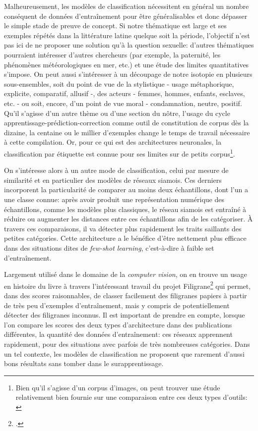 Malheureusement, les modèles de classification nécessitent en général un nombre conséquent de données d'entraînement pour être généralisables et donc dépasser le simple stade de preuve de concept. Si notre thématique est large et ses exemples répétés dans la littérature latine quelque soit la période, l'objectif n'est pas ici de ne proposer une solution qu'à la question sexuelle: d'autres thématiques pourraient intéresser d'autres chercheurs (par exemple, la paternité, les phénomènes météorologiques en mer, etc.) et une étude des limites quantitatives s'impose. On peut aussi s'intéresser à un découpage de notre isotopie en plusieurs sous-ensembles, soit du point de vue de la stylistique - usage métaphorique, explicite, comparatif, allusif -, des acteurs - femmes, hommes, enfants, esclaves, etc. - ou soit, encore, d'un point de vue moral - condamnation, neutre, positif. Qu'il s'agisse d'un autre thème ou d'une section du nôtre, l'usage du cycle apprentissage-prédiction-correction comme outil de constitution de corpus dès la dizaine, la centaine ou le millier d'exemples change le temps de travail nécessaire à cette compilation. Or, pour ce qui est des architectures neuronales, la classification par étiquette est connue pour ses limites sur de petits corpus\footnote{Bien qu'il s'agisse d'un corpus d'images, on peut trouver une étude relativement bien fournie sur une comparaison entre ces deux types d'outils: \cite{pasupa_comparison_2016}}. %

On s'intéresse alors à un autre mode de classification, celui par mesure de similarité et en particulier des modèles de réseaux siamois. Ces derniers incorporent la particularité de comparer au moins deux échantillons, dont l'un a une classe connue: après avoir produit une représentation numérique des échantillons, comme les modèles plus classiques, le réseau siamois est entraîné à réduire ou augmenter les distances entre ces échantillons afin de les catégoriser. À travers ces comparaisons, il va détecter plus rapidement les traits saillants des petites catégories. Cette architecture a le bénéfice d'être nettement plus efficace dans des situations dites de \textit{few-shot learning}, c'est-à-dire à faible set d'entraînement. 

Largement utilisé dans le domaine de la \textit{computer vision}, on en trouve un usage en histoire du livre à travers l'intéressant travail du projet Filigrane\footcite{shen_large-scale_2021} qui permet, dans des scores raisonnables, de classer facilement des filigranes papiers à partir de très peu d'exemples d'entraînement, mais y compris de potentiellement détecter des filigranes inconnus. Il est important de prendre en compte, lorsque l'on compare les scores des deux types d'architecture dans des publications différentes, la quantité des données d'entraînement: ces réseaux apprennent rapidement, pour des situations avec parfois de très nombreuses catégories. Dans un tel contexte, les modèles de classification ne proposent que rarement d'aussi bons résultats sans tomber dans le surapprentissage.

